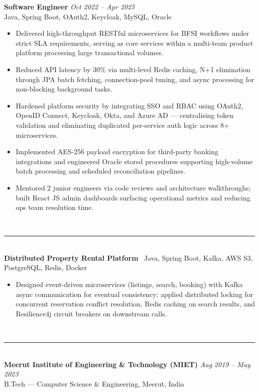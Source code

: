 \documentclass[10pt]{article}
\newcommand{\ressection}[1]{%
  \vspace{5pt}\noindent{\bfseries\color{accent}\MakeUppercase{#1}}\\[1pt]%
  \noindent\textcolor{gray!55}{\rule{\linewidth}{0.7pt}}\\[2pt]%
}
\begin{document}
\vspace{3pt}
\textbf{Software Engineer} \hfill \textit{Oct 2022 -- Apr 2025}\\
{\color{accent}\footnotesize Java, Spring Boot, OAuth2, Keycloak, MySQL, Oracle}
\begin{itemize}
\item Delivered high-throughput RESTful microservices for BFSI workflows under strict SLA requirements, serving as core services within a multi-team product platform processing large transactional volumes.
\item Reduced API latency by 30\% via multi-level Redis caching, N+1 elimination through JPA batch fetching, connection-pool tuning, and async processing for non-blocking background tasks.
\item Hardened platform security by integrating SSO and RBAC using OAuth2, OpenID Connect, Keycloak, Okta, and Azure AD --- centralising token validation and eliminating duplicated per-service auth logic across 8+ microservices.
\item Implemented AES-256 payload encryption for third-party banking integrations and engineered Oracle stored procedures supporting high-volume batch processing and scheduled reconciliation pipelines.
\item Mentored 2 junior engineers via code reviews and architecture walkthroughs; built React JS admin dashboards surfacing operational metrics and reducing ops team resolution time.
\end{itemize}

\ressection{Projects}
\textbf{Distributed Property Rental Platform} \textbar\ {\footnotesize Java, Spring Boot, Kafka, AWS S3, PostgreSQL, Redis, Docker}
\begin{itemize}
\item Designed event-driven microservices (listings, search, booking) with Kafka async communication for eventual consistency; applied distributed locking for concurrent reservation conflict resolution, Redis caching on search results, and Resilience4j circuit breakers on downstream calls.
\end{itemize}

\ressection{Education}
\textbf{Meerut Institute of Engineering \& Technology (MIET)} \hfill \textit{Aug 2019 -- May 2023}\\
B.Tech --- Computer Science \& Engineering, Meerut, India
\end{document}
